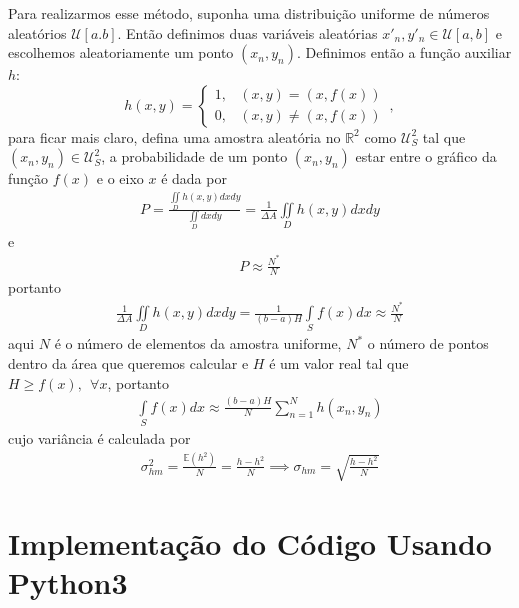 \documentclass{article}
\begin{document}
Para realizarmos esse método, suponha uma distribuição uniforme de números aleatórios $\mathcal{U}[a.b]$. Então definimos duas variáveis aleatórias $x'_n,y'_n\in\mathcal{U}[a,b]$ e escolhemos aleatoriamente um ponto $(x_n,y_n)$. Definimos então a função auxiliar $h$:
$$h(x,y)=\begin{cases}
1,&(x,y)=(x,f(x))\\
0,&(x,y)\neq (x,f(x))
\end{cases}\,,$$
para ficar mais claro, defina uma amostra aleatória no $\mathbb{R}^2$ como $\mathcal{U}^2_{S}$ tal que $(x_n,y_n)\in \mathcal{U}^2_{S}$, a probabilidade de um ponto $(x_n,y_n)$ estar entre o gráfico da função $f(x)$ e o eixo $x$ é dada por
\begin{align*}
    P=\frac{\iint\limits_{D}h(x,y)dxdy}{\iint\limits_{D}dxdy}=\frac{1}{\Delta A}\iint\limits_{D}h(x,y)dxdy
\end{align*}
e
\begin{align*}
    P\approx \frac{N^*}{N}
\end{align*}
portanto
\begin{align}
    \frac{1}{\Delta A}\iint\limits_{D}h(x,y)dxdy=\frac{1}{(b-a)H}\int\limits_{S}f(x)dx\approx \frac{N^*}{N}
\end{align}
aqui $N$ é o número de elementos da amostra uniforme, $N^*$ o número de pontos dentro da área que queremos calcular e $H$ é um valor real tal que $H\geq f(x),~~\forall x$, portanto
\begin{align}
    \int\limits_{S}f(x)dx\approx \frac{(b-a)H}{N}\sum_{n=1}^{N}h(x_n,y_n)
\end{align}
cujo variância é calculada por
\begin{align*}
    \sigma_{hm}^2=\frac{\mathbb{E}\left(h^2\right)}{N}=\frac{h-h^2}{N}\implies \sigma_{hm}=\sqrt{\frac{h-h^2}{N}}
\end{align*}

\section{Implementação do Código Usando Python3}
\end{document}
